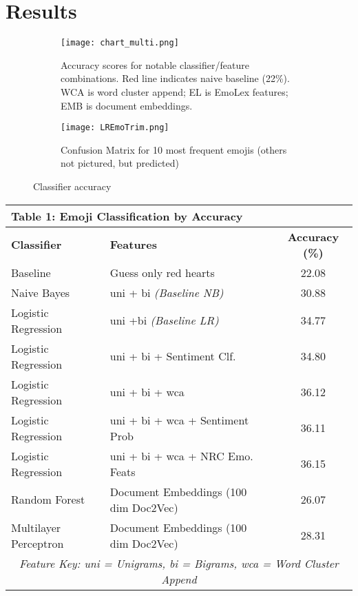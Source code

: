 \documentclass[11pt]{article}
\begin{document}
\section{Results}
\begin{figure}
\centering
\begin{subfigure}[t]{.55\textwidth}
  \centering
  \texttt{[image: chart\_multi.png]}
  \caption{Accuracy scores for notable classifier/feature combinations. Red line indicates naive baseline (22\%). WCA is word cluster append; EL is EmoLex features; EMB is document embeddings.}
  \label{fig:multi}
\end{subfigure}\hfill
\begin{subfigure}[t]{.4\textwidth}
  \centering
  \texttt{[image: LREmoTrim.png]}
  \caption{Confusion Matrix for 10 most frequent emojis (others not pictured, but predicted)}
  \label{fig:conf10}
\end{subfigure}
\caption{Classifier accuracy}
\label{fig:results}
\end{figure}

\bgroup
\def\arraystretch{1.25}
\begin{center}
 \begin{tabular}{|l | l | c |} 
 \multicolumn{3}{l}{Table 1: Emoji Classification by Accuracy} \\
 \hline
 \textbf{Classifier} & \textbf{Features} & \textbf{Accuracy (\%)} \\
 \hline
 Baseline & Guess only red hearts & 22.08 \\
 \hline
 Naive Bayes & uni + bi \textit{(Baseline NB)} & 30.88 \\ 
 \hline
 Logistic Regression & uni +bi \textit{(Baseline LR)} & 34.77  \\
 \hline
 Logistic Regression & uni + bi + Sentiment Clf. & 34.80 \\
 \hline
 Logistic Regression & uni + bi + wca & 36.12 \\
 \hline
 Logistic Regression & uni + bi + wca + Sentiment Prob & 36.11 \\
 \hline
 Logistic Regression & uni + bi + wca + NRC Emo. Feats & 36.15 \\
 \hline
 Random Forest & Document Embeddings (100 dim Doc2Vec) & 26.07 \\
 \hline
 Multilayer Perceptron & Document Embeddings (100 dim Doc2Vec) & 28.31 \\ 
 \hline
 \multicolumn{3}{c}{\textit{Feature Key: uni = Unigrams, bi = Bigrams, wca = Word Cluster Append}} \\[1ex]
\end{tabular}
\end{center}
\egroup
\end{document}
